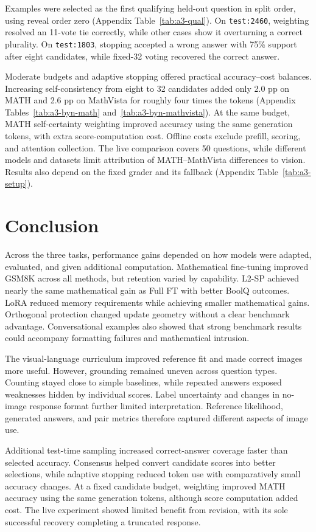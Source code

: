 \documentclass{article}
\begin{document}
Examples were selected as the first qualifying held-out question in split order, using reveal order zero (Appendix Table~\ref{tab:a3-qual}). On \texttt{test:2460}, weighting resolved an 11-vote tie correctly, while other cases show it overturning a correct plurality. On \texttt{test:1803}, stopping accepted a wrong answer with 75\% support after eight candidates, while fixed-32 voting recovered the correct answer.

Moderate budgets and adaptive stopping offered practical accuracy–cost balances. Increasing self-consistency from eight to 32 candidates added only 2.0 pp on MATH and 2.6 pp on MathVista for roughly four times the tokens (Appendix Tables~\ref{tab:a3-byn-math} and~\ref{tab:a3-byn-mathvista}). At the same budget, MATH self-certainty weighting improved accuracy using the same generation tokens, with extra score-computation cost. Offline costs exclude prefill, scoring, and attention collection. The live comparison covers 50 questions, while different models and datasets limit attribution of MATH–MathVista differences to vision. Results also depend on the fixed grader and its fallback (Appendix Table~\ref{tab:a3-setup}).

\section{Conclusion}
Across the three tasks, performance gains depended on how models were adapted, evaluated, and given additional computation. Mathematical fine-tuning improved GSM8K across all methods, but retention varied by capability. L2-SP achieved nearly the same mathematical gain as Full FT with better BoolQ outcomes. LoRA reduced memory requirements while achieving smaller mathematical gains. Orthogonal protection changed update geometry without a clear benchmark advantage. Conversational examples also showed that strong benchmark results could accompany formatting failures and mathematical intrusion.

The visual-language curriculum improved reference fit and made correct images more useful. However, grounding remained uneven across question types. Counting stayed close to simple baselines, while repeated answers exposed weaknesses hidden by individual scores. Label uncertainty and changes in no-image response format further limited interpretation. Reference likelihood, generated answers, and pair metrics therefore captured different aspects of image use.

Additional test-time sampling increased correct-answer coverage faster than selected accuracy. Consensus helped convert candidate scores into better selections, while adaptive stopping reduced token use with comparatively small accuracy changes. At a fixed candidate budget, weighting improved MATH accuracy using the same generation tokens, although score computation added cost. The live experiment showed limited benefit from revision, with its sole successful recovery completing a truncated response.
\end{document}
